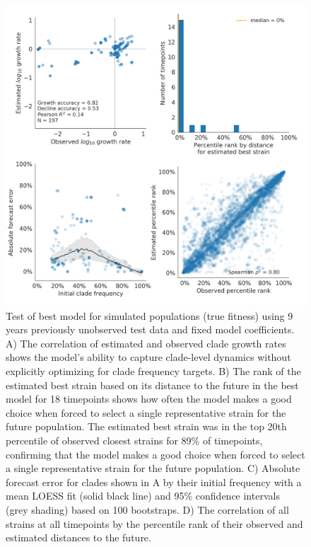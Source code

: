 \begin{figure}[p]
  \begin{center}
  \includegraphics[width=\textwidth]{figures/test-of-best-model-for-simulated-populations.png}
  \caption{
  Test of best model for simulated populations (true fitness) using 9 years previously unobserved test data and fixed model coefficients.
  A) The correlation of estimated and observed clade growth rates shows the model's ability to capture clade-level dynamics without explicitly optimizing for clade frequency targets.
  B) The rank of the estimated best strain based on its distance to the future in the best model for 18 timepoints shows how often the model makes a good choice when forced to select a single representative strain for the future population.
  The estimated best strain was in the top 20th percentile of observed closest strains for 89\% of timepoints, confirming that the model makes a good choice when forced to select a single representative strain for the future population.
  C) Absolute forecast error for clades shown in A by their initial frequency with a mean LOESS fit (solid black line) and 95\% confidence intervals (grey shading) based on 100 bootstraps.
  D) The correlation of all strains at all timepoints by the percentile rank of their observed and estimated distances to the future.
  }
  \label{fig:test_of_best_model_for_simulated_populations}
  \end{center}
\end{figure}

